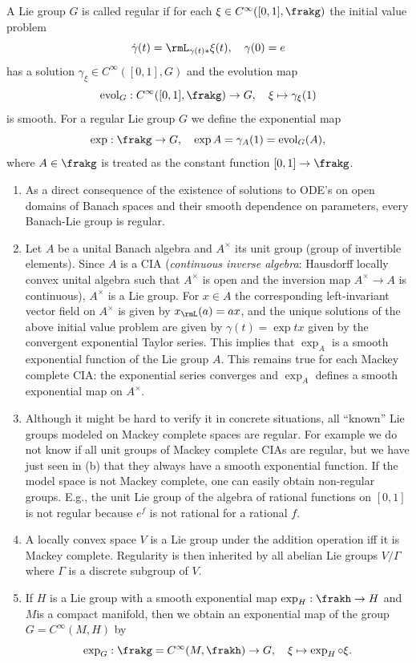 \begin{defn}
    A Lie group $G$ is called regular if for each $\xi\in C^\infty([0,1],\frakg)$ the initial value problem
    \[\dot\gamma(t)=\rmL_{\gamma(t)\ast}\xi(t),\quad \gamma(0)=e\]
    has a solution $\gamma_\xi\in C^\infty([0,1],G)$ and the evolution map 
    \[\mathrm{evol}_G:C^\infty([0,1],\frakg)\to G,\quad \xi\mapsto \gamma_\xi(1)\]
    is smooth. For a regular Lie group $G$ we define the exponential map
    \[\exp:\frakg\to G,\quad \exp A=\gamma_A(1)=\mathrm{evol}_G(A),\]
    where $A\in\frakg$ is treated as the constant function $[0,1]\to \frakg$.
\end{defn}
\begin{rem}
    \begin{enumerate}[label=(\alph*)]
        \item As a direct consequence of the existence of solutions to ODE's on open domains of Banach spaces and their smooth dependence on parameters, every Banach-Lie group is regular.
        \item Let $A$ be a unital Banach algebra and $A^\times$ its unit group (group of invertible elements). Since $A$ is a CIA (\emph{continuous inverse algebra}: Hausdorff locally convex unital algebra such that $A^\times$ is open and the inversion map $A^\times\to A$ is continuous), $A^\times$ is a Lie group. For $x\in A$ the corresponding left-invariant vector field on $A^\times$ is given by $x_\rmL(a)=ax$, and the unique solutions of the above initial value problem are given by $\gamma(t)=\exp tx$ given by the convergent exponential Taylor series. This implies that $\exp_A$ is a smooth exponential function of the Lie group $A$. This remains true for each Mackey complete CIA: the exponential series converges and $\exp_A$ defines a smooth exponential map on $A^\times$.
        \item Although it might be hard to verify it in concrete situations, all ``known'' Lie groups modeled on Mackey complete spaces are regular. For example we do not know if all unit groups of Mackey complete CIAs are regular, but we have just seen in (b) that they always have a smooth exponential function. If the model space is not Mackey complete, one can easily obtain non-regular groups. E.g., the unit Lie group of the algebra of rational functions on $[0,1]$ is not regular because $e^f$ is not rational for a rational $f$.
        \item A locally convex space $V$ is a Lie group under the addition operation iff it is Mackey complete. Regularity is then inherited by all abelian Lie groups $V\slash \Gamma$ where $\Gamma$ is a discrete subgroup of $V$.
        \item If $H$ is a Lie group with a smooth exponential map $\exp_H:\frakh\to H$ and $M$is a compact manifold, then we obtain an exponential map of the group $G=C^\infty(M,H)$ by
        \[\exp_G:\frakg=C^\infty(M,\frakh)\to G,\quad \xi\mapsto \exp_H\circ \xi.\]
    \end{enumerate}
\end{rem}

